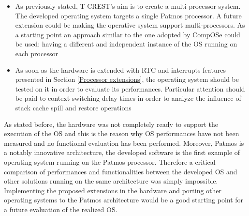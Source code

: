 \begin{itemize}
	\item As previously stated, T-CREST's aim is to create a multi-processor system. The developed operating system targets a single Patmos processor. A future extension could be making the operative system support multi-processors. As a starting point an approach similar to the one adopted by CompOSe could be used: having a different and independent instance of the OS running on each processor~\cite{Hansson:2011:DIO:1945082.1945194}
	\item As soon as the hardware is extended with RTC and interrupts features presented in Section \ref{Processor extensions}, the operating system should be tested on it in order to evaluate its performances. Particular attention should be paid to context switching delay times in order to analyze the influence of stack cache spill and restore operations
\end{itemize}

As stated before, the hardware was not completely ready to support the execution of the OS and this is the reason why OS performances have not been measured and no functional evaluation has been performed. Moreover, Patmos is a notably innovative architecture, the developed software is the first example of operating system running on the Patmos processor. Therefore a critical comparison of performances and functionalities between the developed OS and other solutions running on the same architecture was simply impossible.\\
Implementing the proposed extensions in the hardware and porting other operating systems to the Patmos architecture would be a  good starting point for a future evaluation of the realized OS. 

